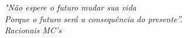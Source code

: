 \begin{epigrafe}
\vspace*{\fill}
\begin{flushright}
\emph{"Não espere o futuro mudar sua vida
\\Porque o futuro será a consequência do presente”. 
  \\ Racionais MC's}
\end{flushright}
\end{epigrafe}